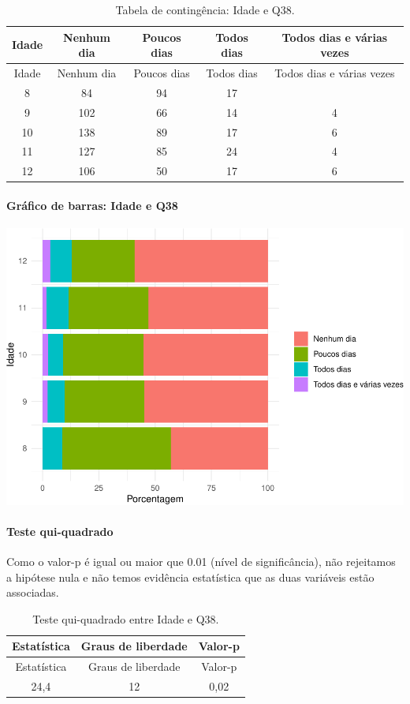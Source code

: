 \documentclass[]{article}
\let\oldparagraph\paragraph
\renewcommand{\paragraph}[1]{\oldparagraph{#1}\mbox{}}
\begin{document}
\begin{longtable}[]{@{}ccccc@{}}
\caption{\label{tab:unnamed-chunk-1449}Tabela de contingência: Idade e Q38.}\tabularnewline
\toprule
Idade & Nenhum dia & Poucos dias & Todos dias & Todos dias e várias vezes\tabularnewline
\midrule
\endfirsthead
\toprule
Idade & Nenhum dia & Poucos dias & Todos dias & Todos dias e várias vezes\tabularnewline
\midrule
\endhead
8 & 84 & 94 & 17 &\tabularnewline
9 & 102 & 66 & 14 & 4\tabularnewline
10 & 138 & 89 & 17 & 6\tabularnewline
11 & 127 & 85 & 24 & 4\tabularnewline
12 & 106 & 50 & 17 & 6\tabularnewline
\bottomrule
\end{longtable}

\hypertarget{gruxe1fico-de-barras-idade-e-q38}{%
\paragraph{Gráfico de barras: Idade e Q38}\label{gruxe1fico-de-barras-idade-e-q38}}

\begin{center}\includegraphics[width=0.75\linewidth]{relatorio_covid19_files/figure-latex/unnamed-chunk-1450-1} \end{center}

\hypertarget{teste-qui-quadrado-124}{%
\paragraph{Teste qui-quadrado}\label{teste-qui-quadrado-124}}

Como o valor-p é igual ou maior que 0.01 (nível de significância), não rejeitamos a hipótese nula e não temos evidência estatística que as duas variáveis estão associadas.

\begin{longtable}[]{@{}ccc@{}}
\caption{\label{tab:unnamed-chunk-1452}Teste qui-quadrado entre Idade e Q38.}\tabularnewline
\toprule
Estatística & Graus de liberdade & Valor-p\tabularnewline
\midrule
\endfirsthead
\toprule
Estatística & Graus de liberdade & Valor-p\tabularnewline
\midrule
\endhead
24,4 & 12 & 0,02\tabularnewline
\bottomrule
\end{longtable}
\end{document}
